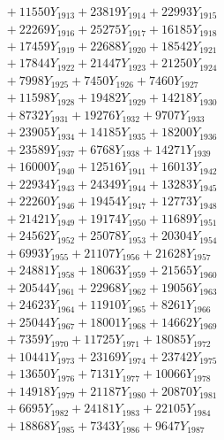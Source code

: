 \documentclass[a4paper,10pt]{article}
\begin{document}
{\begin{align}
&\;  + 11550 Y_{1913} + 23819 Y_{1914} + 22993 Y_{1915} \\[0.3ex]
&\;  + 22269 Y_{1916} + 25275 Y_{1917} + 16185 Y_{1918} \\[0.5ex]\allowbreak
&\;  + 17459 Y_{1919} + 22688 Y_{1920} + 18542 Y_{1921} \\[0.3ex]
&\;  + 17844 Y_{1922} + 21447 Y_{1923} + 21250 Y_{1924} \\[0.3ex]
&\;  + 7998 Y_{1925} + 7450 Y_{1926} + 7460 Y_{1927} \\[0.3ex]
&\;  + 11598 Y_{1928} + 19482 Y_{1929} + 14218 Y_{1930} \\[0.3ex]
&\;  + 8732 Y_{1931} + 19276 Y_{1932} + 9707 Y_{1933} \\[0.3ex]
&\;  + 23905 Y_{1934} + 14185 Y_{1935} + 18200 Y_{1936} \\[0.3ex]
&\;  + 23589 Y_{1937} + 6768 Y_{1938} + 14271 Y_{1939} \\[0.3ex]
&\;  + 16000 Y_{1940} + 12516 Y_{1941} + 16013 Y_{1942} \\[0.3ex]
&\;  + 22934 Y_{1943} + 24349 Y_{1944} + 13283 Y_{1945} \\[0.3ex]
&\;  + 22260 Y_{1946} + 19454 Y_{1947} + 12773 Y_{1948} \\[0.5ex]\allowbreak
&\;  + 21421 Y_{1949} + 19174 Y_{1950} + 11689 Y_{1951} \\[0.3ex]
&\;  + 24562 Y_{1952} + 25078 Y_{1953} + 20304 Y_{1954} \\[0.3ex]
&\;  + 6993 Y_{1955} + 21107 Y_{1956} + 21628 Y_{1957} \\[0.3ex]
&\;  + 24881 Y_{1958} + 18063 Y_{1959} + 21565 Y_{1960} \\[0.3ex]
&\;  + 20544 Y_{1961} + 22968 Y_{1962} + 19056 Y_{1963} \\[0.3ex]
&\;  + 24623 Y_{1964} + 11910 Y_{1965} + 8261 Y_{1966} \\[0.3ex]
&\;  + 25044 Y_{1967} + 18001 Y_{1968} + 14662 Y_{1969} \\[0.3ex]
&\;  + 7359 Y_{1970} + 11725 Y_{1971} + 18085 Y_{1972} \\[0.3ex]
&\;  + 10441 Y_{1973} + 23169 Y_{1974} + 23742 Y_{1975} \\[0.3ex]
&\;  + 13650 Y_{1976} + 7131 Y_{1977} + 10066 Y_{1978} \\[0.5ex]\allowbreak
&\;  + 14918 Y_{1979} + 21187 Y_{1980} + 20870 Y_{1981} \\[0.3ex]
&\;  + 6695 Y_{1982} + 24181 Y_{1983} + 22105 Y_{1984} \\[0.3ex]
&\;  + 18868 Y_{1985} + 7343 Y_{1986} + 9647 Y_{1987} \\[0.3ex]

\end{align}}
\end{document}
